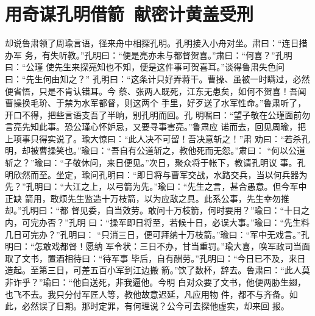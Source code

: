 \chapter{用奇谋孔明借箭~献密计黄盖受刑}

却说鲁肃领了周瑜言语，径来舟中相探孔明。孔明接入小舟对坐。肃曰：“连日措办军
务，有失听教。”孔明曰：“便是亮亦未与都督贺喜。”肃曰：“何喜？”孔明曰：“公瑾
使先生来探亮知也不知，便是这件事可贺喜耳。”谈得鲁肃失色问曰：“先生何由知之？”
孔明曰：“这条计只好弄蒋干。曹操、虽被一时瞒过，必然便省悟，只是不肯认错耳。今
蔡、张两人既死，江东无患矣，如何不贺喜！吾闻曹操换毛玠、于禁为水军都督，则这两个
手里，好歹送了水军性命。”鲁肃听了，开口不得，把些言语支吾了半晌，别孔明而回。孔
明嘱曰：“望子敬在公瑾面前勿言亮先知此事。恐公瑾心怀妒忌，又要寻事害亮。”鲁肃应
诺而去，回见周瑜，把上项事只得实说了。瑜大惊曰：“此人决不可留！吾决意斩之！”肃
劝曰：“若杀孔明，却被曹操笑也。”瑜曰：“吾自有公道斩之，教他死而无怨。”肃曰：
“何以公道斩之？”瑜曰：“子敬休问，来日便见。”次日，聚众将于帐下，教请孔明议
事。孔明欣然而至。坐定，瑜问孔明曰：“即日将与曹军交战，水路交兵，当以何兵器为
先？”孔明曰：“大江之上，以弓箭为先。”瑜曰：“先生之言，甚合愚意。但今军中正缺
箭用，敢烦先生监造十万枝箭，以为应敌之具。此系公事，先生幸勿推却。”孔明曰：“都
督见委，自当效劳。敢问十万枝箭，何时要用？”瑜曰：“十日之内，可完办否？”孔明
曰：“操军即日将至，若候十日，必误大事。”瑜曰：“先生料几日可完办？”孔明曰：
“只消三日，便可拜纳十万枝箭。”瑜曰：“军中无戏言。”孔明曰：“怎敢戏都督！愿纳
军令状：三日不办，甘当重罚。”瑜大喜，唤军政司当面取了文书，置酒相待曰：“待军事
毕后，自有酬劳。”孔明曰：“今日已不及，来日造起。至第三日，可差五百小军到江边搬
箭。”饮了数杯，辞去。鲁肃曰：“此人莫非诈乎？”瑜曰：“他自送死，非我逼他。今明
白对众要了文书，他便两胁生翅，也飞不去。我只分付军匠人等，教他故意迟延，凡应用物
件，都不与齐备。如此，必然误了日期。那时定罪，有何理说？公今可去探他虚实，却来回
报。

